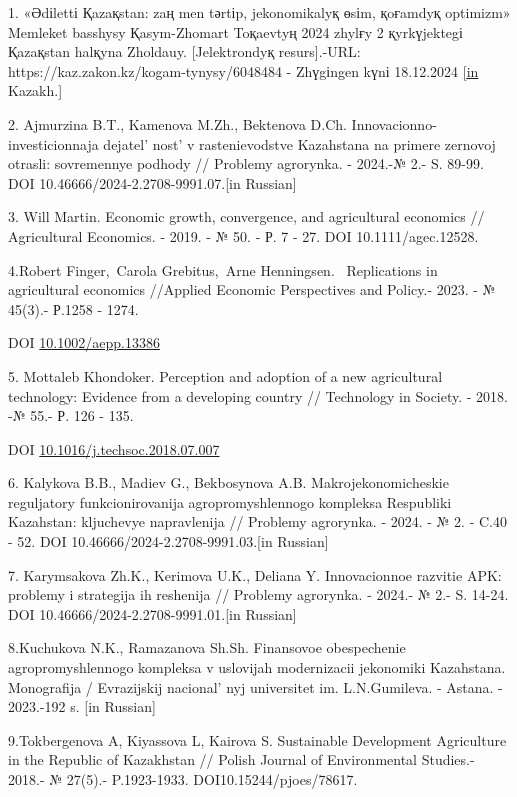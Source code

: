 \begin{references}
1. «Әdіlettі Қazaқstan: zaң men tәrtіp, jekonomikalyқ өsіm, қoғamdyқ
optimizm» Memleket basshysy Қasym-Zhomart Toқaevtyң 2024 zhylғy 2
қyrkүjektegі Қazaқstan halқyna Zholdauy. {[}Jelektrondyқ resurs{]}.-URL:
https://kaz.zakon.kz/kogam-tynysy/6048484 - Zhүgіngen kүnі 18.12.2024
\href{https://kaz.zakon.kz/kogam-tynysy/6048484.\%20\%20\%20\%5bin}{{[}in}
Kazakh.{]}

2. Ajmurzina B.T., Kamenova M.Zh., Bektenova D.Ch.
Innovacionno-investicionnaja
dejatel' nost'{} v rastenievodstve
Kazahstana na primere zernovoj otrasli: sovremennye podhody // Problemy
agrorynka. - 2024.-№ 2.- S. 89-99. DOI
10.46666/2024-2.2708-9991.07.{[}in Russian{]}

3. Will Martin. Economic growth, convergence, and agricultural economics
// Agricultural Economics. - 2019. - № 50. - Р. 7 - 27. DOI
10.1111/agec.12528.

4.Robert Finger,~Carola Grebitus,~Arne Henningsen. ~Replications in
agricultural economics //Applied Economic Perspectives and Policy.-
2023. - № 45(3).- Р.1258 - 1274.

DOI \href{https://doi.org/10.1002/aepp.13386}{10.1002/aepp.13386}

5. Mottaleb Khondoker. Perception and adoption of a new agricultural
technology: Evidence from a developing country // Technology in Society.
- 2018. -№ 55.- Р. 126 - 135.

DOI
\href{http://dx.doi.org/10.1016/j.techsoc.2018.07.007}{10.1016/j.techsoc.2018.07.007}

6. Kalykova B.B., Madiev G., Bekbosynova A.B. Makrojekonomicheskie
reguljatory funkcionirovanija agropromyshlennogo kompleksa Respubliki
Kazahstan: kljuchevye napravlenija // Problemy agrorynka. - 2024. - № 2.
- C.40 - 52. DOI 10.46666/2024-2.2708-9991.03.{[}in Russian{]}

7. Karymsakova Zh.K., Kerimova U.K., Deliana Y. Innovacionnoe razvitie
APK: problemy i strategija ih reshenija // Problemy agrorynka. - 2024.-
№ 2.- S. 14-24. DOI 10.46666/2024-2.2708-9991.01.{[}in Russian{]}

8.Kuchukova N.K., Ramazanova Sh.Sh. Finansovoe obespechenie
agropromyshlennogo kompleksa v uslovijah modernizacii jekonomiki
Kazahstana. Monografija / Evrazijskij nacional' nyj
universitet im. L.N.Gumileva. - Astana. - 2023.-192 s. {[}in Russian{]}

9.Tokbergenova A, Kiyassova L, Kairova S. Sustainable Development
Agriculture in the Republic of Kazakhstan // Polish Journal of
Environmental Studies.- 2018.- № 27(5).- P.1923-1933.
DOI10.15244/pjoes/78617.


\end{references}
